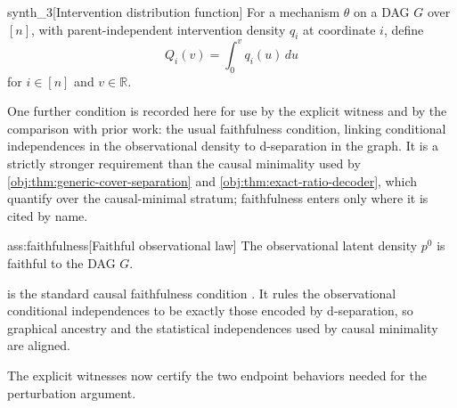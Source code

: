 \documentclass[11pt]{article}
\begin{document}
\begin{definitionv}{synth_3}[Intervention distribution function]
For a mechanism \(\theta\) on a DAG \(G\) over \([n]\), with parent-independent intervention density \(q_i\) at coordinate \(i\), define
\[
Q_i(v)=\int_0^v q_i(u)\,du
\]
for \(i\in[n]\) and \(v\in\mathbb R\).
\end{definitionv}

One further condition is recorded here for use by the explicit witness and by the comparison with prior work: the usual faithfulness condition, linking conditional independences in the observational density to d-separation in the graph. It is a strictly stronger requirement than the causal minimality used by \cref{obj:thm:generic-cover-separation} and \cref{obj:thm:exact-ratio-decoder}, which quantify over the causal-minimal stratum; faithfulness enters only where it is cited by name.

\begin{assumptionv}{ass:faithfulness}[Faithful observational law]
The observational latent density \(p^0\) is faithful to the DAG \(G\).
\end{assumptionv}

 is the standard causal faithfulness condition \citep{SpirtesGlymourScheines2000}. It rules the observational conditional independences to be exactly those encoded by d-separation, so graphical ancestry and the statistical independences used by causal minimality are aligned.

The explicit witnesses now certify the two endpoint behaviors needed for the perturbation argument.
\end{document}

